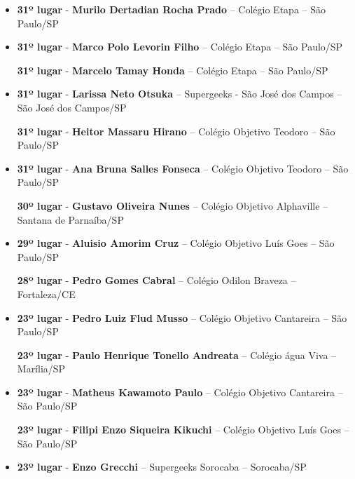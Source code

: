 \documentclass{article}
\begin{document}
\begin{itemize}
\item
\textbf{31º lugar} - \textbf{Murilo Dertadian Rocha Prado} – Colégio Etapa – São Paulo/SP



\item
\textbf{31º lugar} - \textbf{Marco Polo Levorin Filho} – Colégio Etapa – São Paulo/SP


\textbf{31º lugar} - \textbf{Marcelo Tamay Honda} – Colégio Etapa – São Paulo/SP



\item
\textbf{31º lugar} - \textbf{Larissa Neto Otsuka} – Supergeeks - São José dos Campos – São José dos Campos/SP


\textbf{31º lugar} - \textbf{Heitor Massaru Hirano} – Colégio Objetivo Teodoro – São Paulo/SP



\item
\textbf{31º lugar} - \textbf{Ana Bruna Salles Fonseca} – Colégio Objetivo Teodoro – São Paulo/SP


\textbf{30º lugar} - \textbf{Gustavo Oliveira Nunes} – Colégio Objetivo Alphaville – Santana de Parnaíba/SP



\item
\textbf{29º lugar} - \textbf{Aluisio Amorim Cruz} – Colégio Objetivo Luís Goes – São Paulo/SP


\textbf{28º lugar} - \textbf{Pedro Gomes Cabral} – Colégio Odilon Braveza – Fortaleza/CE



\item
\textbf{23º lugar} - \textbf{Pedro Luiz Flud Musso} – Colégio Objetivo Cantareira – São Paulo/SP


\textbf{23º lugar} - \textbf{Paulo Henrique Tonello Andreata} – Colégio água Viva – Marília/SP



\item
\textbf{23º lugar} - \textbf{Matheus Kawamoto Paulo} – Colégio Objetivo Cantareira – São Paulo/SP


\textbf{23º lugar} - \textbf{Filipi Enzo Siqueira Kikuchi} – Colégio Objetivo Luís Goes – São Paulo/SP



\item
\textbf{23º lugar} - \textbf{Enzo Grecchi} – Supergeeks Sorocaba – Sorocaba/SP



\end{itemize}
\end{document}
